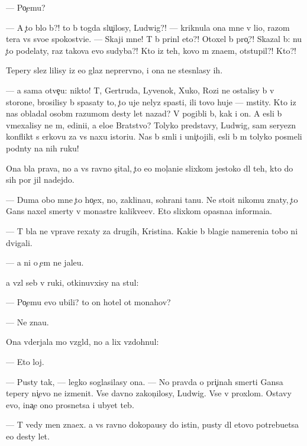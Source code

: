 \documentclass[10pt]{book}
\begin{document}
— Po{\c}emu?

— A {\c}to b{\yi}lo b{\yi}?! {\C}to b{\yi} togda slu{\c}ilosy, Ludwig?! — kriknula ona mne v li{\q}o, razom ter{\ia}{\y}a vs{\e} svo{\y}e spoko{\y}stvi{\y}e. — Skaji mne! T{\yi} b{\yi} prin{\ia}l eto?! Otoxel b{\yi} pro{\c}?! Skazal b{\yi}: nu {\c}to podelaty, raz takova {\y}evo sudyba?! Kto iz teh, kovo m{\yi} zna{\y}em, otstupil?! Kto?!

Tepery slez{\yi} lilisy iz {\y}e{\y}o glaz neprer{\yi}vno, i ona ne stesn{\ia}lasy ih.

— {\Y}a sama otve{\c}u: nikto! T{\yi}, Gertruda, Lyvenok, Xuko, Rozi ne ostalisy b{\yi} v storone, brosilisy b{\yi} spasaty to, {\c}to uje nelyz{\ia} spasti, ili tovo huje — mstity. Kto iz nas obladal osob{\yi}m razumom des{\ia}ty let nazad? V{\yi} pogibli b{\yi}, kak i on. A {\y}esli b{\yi} vmexalisy ne m{\yi}, {\y}edini{\q}i, a {\q}elo{\y}e Bratstvo? Tolyko predstavy, Ludwig, sam{\yi}{\y} seryezn{\yi}{\y} konflikt s {\Q}erkov{\y}u za vs{\iu} naxu istori{\y}u. Nas b{\yi} sm{\ia}li i uni{\c}tojili, {\y}esli b{\yi} m{\yi} tolyko posmeli podn{\ia}ty na nih ruku!

Ona b{\yi}la prava, no {\y}a vs{\e} ravno s{\c}ital, {\c}to {\y}e{\y}o mol{\c}ani{\y}e slixkom jestoko dl{\ia} teh, kto do sih por jil nadejdo{\y}.

— Duma{\y} obo mne {\c}to ho{\c}ex, no, zaklina{\y}u, sohrani ta{\y}nu. Ne sto{\y}it nikomu znaty, {\c}to Gans naxel smerty v monast{\yi}re kalikve{\q}ev. Eto slixkom opasna{\y}a informa{\q}i{\y}a.

— T{\yi} b{\yi}la ne vprave rexaty za drugih, Kristina. Kaki{\y}e b{\yi} blagi{\y}e namereni{\y}a tobo{\y} ni dvigali.

— {\Y}a ni o {\c}em ne jale{\y}u.

{\Y}a vz{\ia}l seb{\ia} v ruki, otkinuvxisy na stul:

— Po{\c}emu {\y}evo ubili? {\C}to on hotel ot monahov?

— Ne zna{\y}u.

Ona v{\yi}derjala mo{\y} vzgl{\ia}d, no {\y}a lix vzdohnul:

— Eto loj.

— Pusty tak, — legko soglasilasy ona. — No pravda o pri{\c}inah smerti Gansa tepery ni{\c}evo ne izmenit. Vse davno zakon{\c}ilosy, Ludwig. Vse v proxlom. Ostavy {\y}evo, ina{\c}e ono prosnetsa i ubyet teb{\ia}.

— T{\yi} vedy men{\ia} zna{\y}ex. {\Y}a vs{\e} ravno dokopa{\y}usy do istin{\yi}, pusty dl{\ia} etovo potrebu{\y}etsa {\y}e{\x}o des{\ia}ty let.
\end{document}

